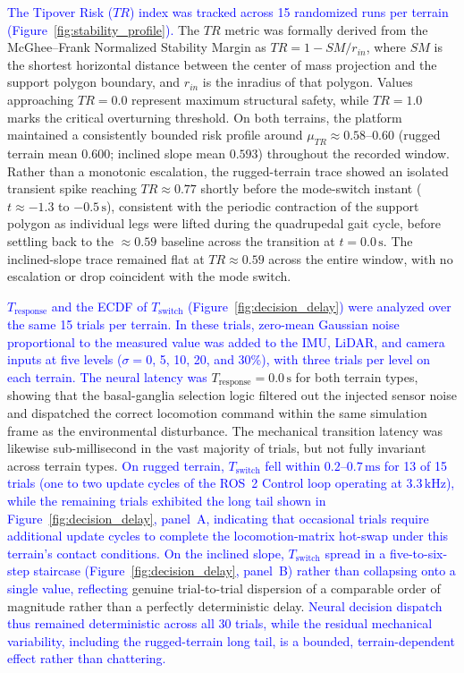 \documentclass[preprint,12pt]{elsarticle}
\newcommand{\revblue}[1]{\textcolor{blue}{#1}}
\begin{document}
\revblue{The Tipover Risk ($TR$) index was tracked across 15 randomized runs per terrain (Figure~\ref{fig:stability_profile}).} The $TR$ metric was formally derived from the McGhee--Frank Normalized Stability Margin as $TR = 1 - SM/r_{in}$, where $SM$ is the shortest horizontal distance between the center of mass projection and the support polygon boundary, and $r_{in}$ is the inradius of that polygon. Values approaching $TR = 0.0$ represent maximum structural safety, while $TR = 1.0$ marks the critical overturning threshold. On both terrains, the platform maintained a consistently bounded risk profile around $\mu_{TR} \approx 0.58$--$0.60$ (rugged terrain mean $0.600$; inclined slope mean $0.593$) throughout the recorded window. Rather than a monotonic escalation, the rugged-terrain trace showed an isolated transient spike reaching $TR \approx 0.77$ shortly before the mode-switch instant ($t \approx -1.3$ to $-0.5\,\text{s}$), consistent with the periodic contraction of the support polygon as individual legs were lifted during the quadrupedal gait cycle, before settling back to the $\approx 0.59$ baseline across the transition at $t = 0.0\,\text{s}$. The inclined-slope trace remained flat at $TR \approx 0.59$ across the entire window, with no escalation or drop coincident with the mode switch.


\revblue{$T_{\text{response}}$ and the ECDF of $T_{\text{switch}}$ (Figure~\ref{fig:decision_delay}) were analyzed over the same 15 trials per terrain.} \revblue{In these trials, zero-mean Gaussian noise proportional to the measured value was added to the IMU, LiDAR, and camera inputs at five levels ($\sigma = 0$, 5, 10, 20, and 30\%), with three trials per level on each terrain.} \revblue{The neural latency was} $T_{\text{response}} = 0.0\,\text{s}$ for both terrain types, showing that the basal-ganglia selection logic filtered out the injected sensor noise and dispatched the correct locomotion command within the same simulation frame as the environmental disturbance. The mechanical transition latency was likewise sub-millisecond in the vast majority of trials, but not fully invariant across terrain types. \revblue{On rugged terrain, $T_{\text{switch}}$ fell within $0.2$--$0.7\,\text{ms}$ for 13 of 15 trials (\revblue{one to two} update cycles of the ROS~2 Control loop operating at $3.3\,\text{kHz}$), while the remaining trials exhibited the long tail shown in Figure~\ref{fig:decision_delay}, panel~A, indicating that occasional trials require additional update cycles to complete the locomotion-matrix hot-swap under this terrain's contact conditions. On the inclined slope, $T_{\text{switch}}$ spread in a five-to-six-step staircase (Figure~\ref{fig:decision_delay}, panel~B) rather than collapsing onto a single value, reflecting} genuine trial-to-trial dispersion of a comparable order of magnitude rather than a perfectly deterministic delay. \revblue{Neural decision dispatch thus remained deterministic across all 30 trials, while the residual mechanical variability, including the rugged-terrain long tail, is a bounded, terrain-dependent effect rather than chattering.}
\end{document}
